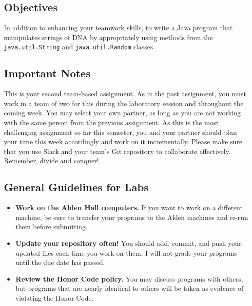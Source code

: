 


\subsection*{Objectives}
\vspace{-0.05in}

In addition to enhancing your teamwork skills, to write a Java program that manipulates strings of DNA by appropriately
using methods from the {\tt java.util.String} and {\tt java.util.Random} classes.

\vspace{-0.05in}
\subsection*{Important Notes}
\vspace{-0.05in}

This is your second team-based assignment. As in the past assignment, you must work in a team of two for this during the
laboratory session and throughout the coming week. You may select your own partner, as long as you are not working with the same
person from the previous assignment.  As this is the most challenging assignment so far this semester, you
and your partner should plan your time this week accordingly and work on it incrementally. Please make sure that you use
Slack and your team's Git repository to collaborate effectively. Remember, divide and conquer!

\vspace{-0.05in}
\subsection*{General Guidelines for Labs}
\vspace{-0.05in}
\begin{itemize}
\item
{\bf Work on the Alden Hall computers.} If you want to work on a different
machine, be sure to transfer your programs to the Alden
machines and re-run them before submitting.
\item
{\bf Update your repository often!} You should add, commit,
and push your updated files each time you work on them.  I will not grade
your programs until the due date has passed.
\item
{\bf Review the Honor Code policy.} You
may discuss programs with others, but programs that are nearly identical
to others will be taken as evidence of violating the Honor Code.
\end{itemize}

